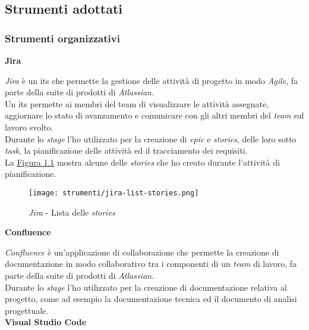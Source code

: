 \pagebreak

\subsection{Strumenti adottati}
\label{sez:strumenti-adottati}

\subsubsection{Strumenti organizzativi}
\label{sez:strumenti-organizzativi}

\noindent \textbf{Jira\\}

\noindent \textit{Jira} è un \gls{its} che permette la gestione delle attività di progetto in modo \textit{Agile}, fa parte della suite di prodotti di \textit{Atlassian}.\\
Un \gls{its} permette ai membri del team di visualizzare le attività assegnate, aggiornare lo stato di avanzamento e comunicare con gli altri membri del \textit{team} sul lavoro svolto. \\
Durante lo \textit{stage} l'ho utilizzato per la creazione di \textit{epic} e \textit{stories}, delle loro sotto \textit{task}, la pianificazione delle attività ed il tracciamento dei requisiti. \\
La {\hyperref[fig:jira-list-stories]{Figura 1.1}} mostra alcune delle \textit{stories} che ho creato durante l'attività di pianificazione.
\begin{figure}[H]
    \label{fig:jira-list-stories}
    \centering
    \texttt{[image: strumenti/jira-list-stories.png]}
    \caption{\textit{Jira} - Lista delle \textit{stories}}
\end{figure}

\noindent \textbf{Confluence\\}

\noindent \textit{Confluence} è un'applicazione di collaborazione che permette la creazione di documentazione in modo collaborativo tra i componenti di un \textit{team} di lavoro, fa parte della suite di prodotti di \textit{Atlassian}.\\
Durante lo \textit{stage} l'ho utilizzato per la creazione di documentazione relativa al progetto, come ad esempio la documentazione tecnica ed il documento di analisi progettuale.\\

\pagebreak
\noindent \textbf{Visual Studio Code\\}

